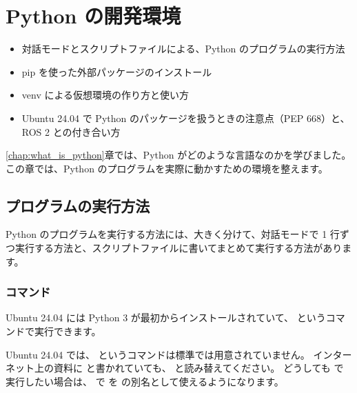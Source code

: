 \chapter{Python の開発環境}
\label{chap:python_env}

\begin{goalbox}
  \begin{itemize}
    \item 対話モードとスクリプトファイルによる、Python のプログラムの実行方法
    \item pip を使った外部パッケージのインストール
    \item venv による仮想環境の作り方と使い方
    \item Ubuntu 24.04 で Python のパッケージを扱うときの注意点（PEP 668）と、ROS 2 との付き合い方
  \end{itemize}
\end{goalbox}

\ref{chap:what_is_python}章では、Python がどのような言語なのかを学びました。
この章では、Python のプログラムを実際に動かすための環境を整えます。

\section{プログラムの実行方法}
\label{sec:python-run}

Python のプログラムを実行する方法には、大きく分けて、対話モードで 1 行ずつ実行する方法と、スクリプトファイルに書いてまとめて実行する方法があります。

\subsection{ コマンド}

Ubuntu 24.04 には Python 3 が最初からインストールされていて、 というコマンドで実行できます。


\begin{caution}
  Ubuntu 24.04 では、 というコマンドは標準では用意されていません。
  インターネット上の資料に  と書かれていても、 と読み替えてください。
  どうしても  で実行したい場合は、 で  を  の別名として使えるようになります。
\end{caution}

